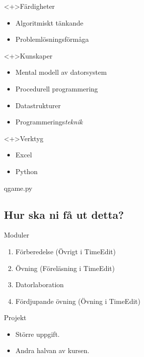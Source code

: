 \begin{frame}
  \begin{block}<+>{Färdigheter}
    \begin{itemize}
      \item Algoritmiskt tänkande
      \item Problemlösningsförmåga
    \end{itemize}
  \end{block}

  \begin{block}<+>{Kunskaper}
    \begin{itemize}
      \item Mental modell av datorsystem
      \item Procedurell programmering
      \item Datastrukturer
      \item Programmerings\emph{teknik}
    \end{itemize}
  \end{block}

  \begin{block}<+>{Verktyg}
    \begin{itemize}
      \item Excel
      \item Python
    \end{itemize}
  \end{block}
\end{frame}

\begin{frame}
  \begin{center}
    \huge
    qgame.py
  \end{center}
\end{frame}

\subsection{Hur ska ni få ut detta?}

\begin{frame}
  \begin{block}{Moduler}
    \begin{enumerate}
      \item Förberedelse (Övrigt i TimeEdit)
      \item Övning (Föreläsning i TimeEdit)
      \item Datorlaboration
      \item Fördjupande övning (Övning i TimeEdit)
    \end{enumerate}
  \end{block}

  \pause

  \begin{block}{Projekt}
    \begin{itemize}
      \item Större uppgift.
      \item Andra halvan av kursen.
    \end{itemize}
  \end{block}
\end{frame}

